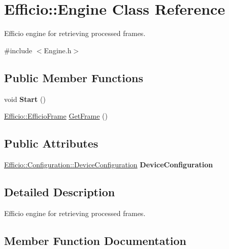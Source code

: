 \hypertarget{class_efficio_1_1_engine}{}\section{Efficio\+:\+:Engine Class Reference}
\label{class_efficio_1_1_engine}


Efficio engine for retrieving processed frames.  




{\ttfamily \#include $<$Engine.\+h$>$}

\subsection*{Public Member Functions}
\begin{DoxyCompactItemize}
\item 
void {\bfseries Start} ()\hypertarget{class_efficio_1_1_engine_a3b6e5c963c14df6e902f72df6a521fd1}{}\label{class_efficio_1_1_engine_a3b6e5c963c14df6e902f72df6a521fd1}

\item 
\hyperlink{class_efficio_1_1_efficio_frame}{Efficio\+::\+Efficio\+Frame} \hyperlink{class_efficio_1_1_engine_a9496aecb7bd8826739fbd5b7d5299ff8}{Get\+Frame} ()
\end{DoxyCompactItemize}
\subsection*{Public Attributes}
\begin{DoxyCompactItemize}
\item 
\hyperlink{class_efficio_1_1_configuration_1_1_device_configuration}{Efficio\+::\+Configuration\+::\+Device\+Configuration} {\bfseries Device\+Configuration}\hypertarget{class_efficio_1_1_engine_afbaba10c9c508bdcc16625a2e51a6148}{}\label{class_efficio_1_1_engine_afbaba10c9c508bdcc16625a2e51a6148}

\end{DoxyCompactItemize}


\subsection{Detailed Description}
Efficio engine for retrieving processed frames. 

\subsection{Member Function Documentation}
